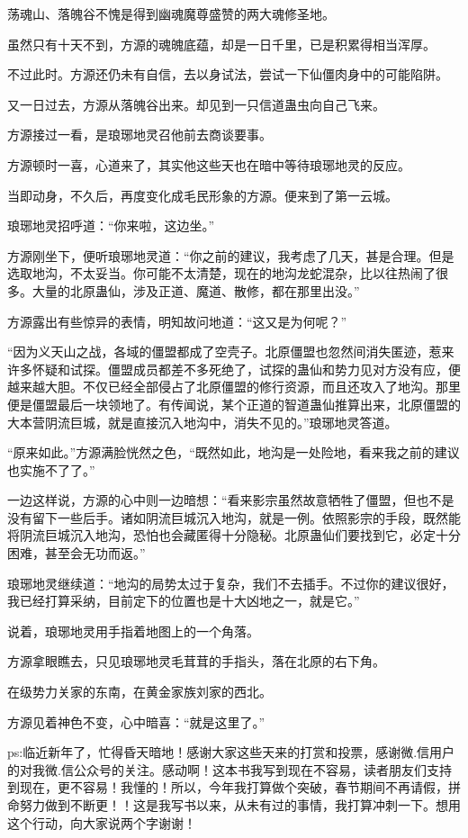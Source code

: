\begin{this_body}
荡魂山、落魄谷不愧是得到幽魂魔尊盛赞的两大魂修圣地。

虽然只有十天不到，方源的魂魄底蕴，却是一日千里，已是积累得相当浑厚。

不过此时。方源还仍未有自信，去以身试法，尝试一下仙僵肉身中的可能陷阱。

又一日过去，方源从落魄谷出来。却见到一只信道蛊虫向自己飞来。

方源接过一看，是琅琊地灵召他前去商谈要事。

方源顿时一喜，心道来了，其实他这些天也在暗中等待琅琊地灵的反应。

当即动身，不久后，再度变化成毛民形象的方源。便来到了第一云城。

琅琊地灵招呼道：“你来啦，这边坐。”

方源刚坐下，便听琅琊地灵道：“你之前的建议，我考虑了几天，甚是合理。但是选取地沟，不太妥当。你可能不太清楚，现在的地沟龙蛇混杂，比以往热闹了很多。大量的北原蛊仙，涉及正道、魔道、散修，都在那里出没。”

方源露出有些惊异的表情，明知故问地道：“这又是为何呢？”

“因为义天山之战，各域的僵盟都成了空壳子。北原僵盟也忽然间消失匿迹，惹来许多怀疑和试探。僵盟成员都差不多死绝了，试探的蛊仙和势力见对方没有应，便越来越大胆。不仅已经全部侵占了北原僵盟的修行资源，而且还攻入了地沟。那里便是僵盟最后一块领地了。有传闻说，某个正道的智道蛊仙推算出来，北原僵盟的大本营阴流巨城，就是直接沉入地沟中，消失不见的。”琅琊地灵答道。

“原来如此。”方源满脸恍然之色，“既然如此，地沟是一处险地，看来我之前的建议也实施不了了。”

一边这样说，方源的心中则一边暗想：“看来影宗虽然故意牺牲了僵盟，但也不是没有留下一些后手。诸如阴流巨城沉入地沟，就是一例。依照影宗的手段，既然能将阴流巨城沉入地沟，恐怕也会藏匿得十分隐秘。北原蛊仙们要找到它，必定十分困难，甚至会无功而返。”

琅琊地灵继续道：“地沟的局势太过于复杂，我们不去插手。不过你的建议很好，我已经打算采纳，目前定下的位置也是十大凶地之一，就是它。”

说着，琅琊地灵用手指着地图上的一个角落。

方源拿眼瞧去，只见琅琊地灵毛茸茸的手指头，落在北原的右下角。

在级势力关家的东南，在黄金家族刘家的西北。

方源见着神色不变，心中暗喜：“就是这里了。”

ps:临近新年了，忙得昏天暗地！感谢大家这些天来的打赏和投票，感谢微.信用户的对我微.信公众号的关注。感动啊！这本书我写到现在不容易，读者朋友们支持到现在，更不容易！我懂的！所以，今年我打算做个突破，春节期间不再请假，拼命努力做到不断更！！这是我写书以来，从未有过的事情，我打算冲刺一下。想用这个行动，向大家说两个字谢谢！

\end{this_body}

